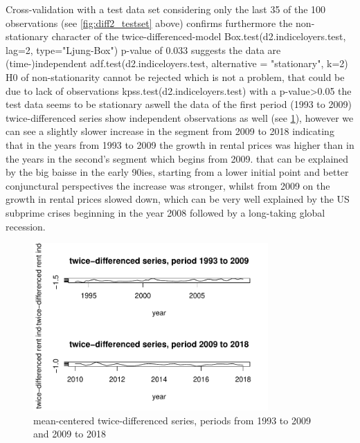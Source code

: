 \documentclass[11pt,a4paper]{article}
\begin{document}
Cross-validation with a test data set considering only the last 35 of the 100 observations (see \cref{fig:diff2_testset} above) confirms furthermore the non-stationary character of the twice-differenced-model 
Box.test(d2.indiceloyers.test, lag=2, type="Ljung-Box") p-value of 0.033 suggests the data are (time-)independent
adf.test(d2.indiceloyers.test, alternative = "stationary", k=2)  H0 of non-stationarity cannot be rejected which is not a problem, that could be due to lack of observations
kpss.test(d2.indiceloyers.test)  with a p-value>0.05 the test data seems to be stationary aswell
the data of the first period (1993 to 2009) twice-differenced series show independent observations as well (see \cref{fig:diff2_test_train}), however we can see a slightly slower increase in the segment from 2009 to 2018 indicating that in the years from 1993 to 2009 the growth in rental prices was higher than in the years in the second's segment which begins from 2009. that can be explained by the big baisse in the early 90ies, starting from a lower initial point and better conjunctural perspectives the increase was stronger, whilst from 2009 on the growth in rental prices slowed down, which can be very well explained by the US subprime crises beginning in the year 2008 followed by a long-taking global recession.

\begin{figure}
    \centering
    \includegraphics[width=0.8\textwidth]{diff2_test_train}
    \caption{mean-centered twice-differenced series, periods from 1993 to 2009 and 2009 to 2018}
    \label{fig:diff2_test_train}
\end{figure}
\end{document}
